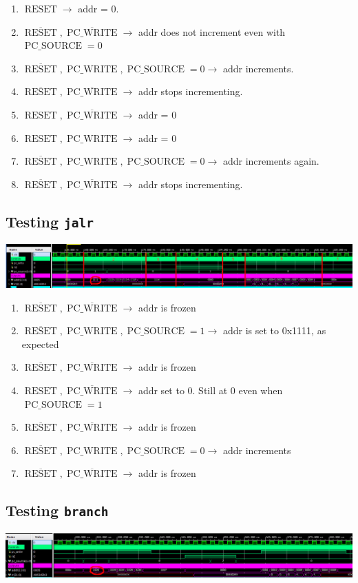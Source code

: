 \documentclass{article}
\DeclareMathOperator{\res}{RESET}
\DeclareMathOperator{\pcw}{PC\_WRITE}
\DeclareMathOperator{\pcs}{PC\_SOURCE}
\begin{document}
\begin{landscape}
\begin{enumerate}
    \item $\res\rightarrow$ addr = 0.
    \item $\overline{\res}, \overline{\pcw} \rightarrow$ addr does not increment even with $\pcs = 0$
    \item $\overline{\res}, \pcw , \pcs = 0\rightarrow$ addr increments.
    \item $\overline{\res}, \overline{\pcw} \rightarrow$ addr stops incrementing.
    \item $\res, \overline{\pcw} \rightarrow$ addr = 0
    \item $\res, \pcw \rightarrow$ addr = 0
    \item $\overline{\res}, \pcw , \pcs = 0\rightarrow$ addr increments again.
    \item $\overline{\res}, \overline{\pcw} \rightarrow$ addr stops incrementing.
\end{enumerate}

\subsection{Testing \texttt{jalr}}
\includegraphics[width=\linewidth]{11.png}
\begin{enumerate}
    \item $\overline{\res}, \overline{\pcw} \rightarrow$ addr is frozen
    \item $\overline{\res}, \pcw, \pcs = 1 \rightarrow$ addr is set to 0x1111, as expected
    \item $\overline{\res}, \overline{\pcw} \rightarrow$ addr is frozen
    \item $\res, \overline{\pcw} \rightarrow$ addr set to 0. Still at 0 even when $\pcs = 1$
    \item $\overline{\res}, \overline{\pcw} \rightarrow$ addr is frozen
    \item $\overline{\res}, \pcw, \pcs = 0\rightarrow$ addr increments
    \item $\overline{\res}, \overline{\pcw} \rightarrow$ addr is frozen
\end{enumerate}

\subsection{Testing \texttt{branch}}
\includegraphics[width=\linewidth]{20.png}


\end{landscape}
\end{document}
